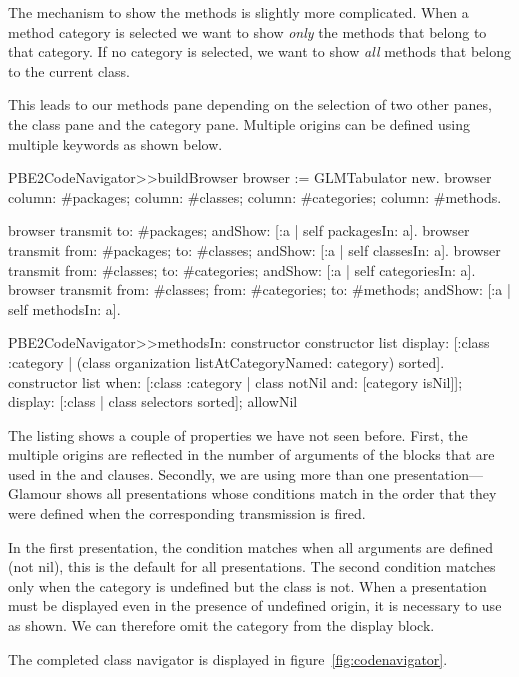 \documentclass[a4paper,10pt,twoside]{book}
\begin{document}
The mechanism to show the methods is slightly more complicated. When a
method category is selected we want to show \emph{only} the methods
that belong to that category. If no category is selected, we want to
show \emph{all} methods that belong to the current class.

This leads to our methods pane depending on the selection of two other
panes, the class pane and the category pane. Multiple origins can be
defined using multiple  keywords as shown below.

\begin{code}{}
PBE2CodeNavigator>>buildBrowser
  browser := GLMTabulator new.
  browser
    column: #packages;
    column:  #classes;
    column: #categories;
    column: #methods.

  browser transmit to: #packages; andShow: [:a | self packagesIn: a].
  browser transmit from: #packages; to: #classes; andShow: [:a | self classesIn: a].
  browser transmit from: #classes; to: #categories; andShow: [:a | self categoriesIn: a].
  browser transmit from: #classes; from: #categories; to: #methods; andShow: [:a | self methodsIn: a].

PBE2CodeNavigator>>methodsIn: constructor
  constructor list
    display: [:class :category | (class organization listAtCategoryNamed: category)
                                      sorted].
  constructor list
    when: [:class :category | class notNil and: [category isNil]];
    display: [:class | class selectors sorted];
    allowNil
\end{code}


The listing shows a couple of properties we have not seen
before. First, the multiple origins are reflected in the number of
arguments of the blocks that are used in the  and
 clauses. Secondly, we are using more than one
presentation---Glamour shows all presentations whose conditions match in
the order that they were defined when the corresponding transmission
is fired.

In the first presentation, the condition matches when all arguments
are defined (not nil), this is the default for all presentations. The
second condition matches only when the category is undefined but the
class is not. When a presentation must be displayed even in the
presence of undefined origin, it is necessary to use  as
shown. We can therefore omit the category from the display block.

The completed class navigator is displayed in
figure~\ref{fig:codenavigator}.
\end{document}
